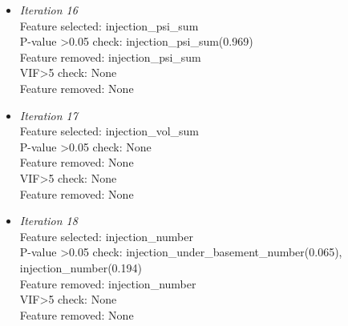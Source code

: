 \documentclass[final-report]{report-template}
\begin{document}
\begin{itemize}
    \item \textit{Iteration 16}\\
    Feature selected: injection\_psi\_sum\\
    P-value \textgreater 0.05 check: injection\_psi\_sum(0.969)\\
    Feature removed: injection\_psi\_sum\\
    VIF\textgreater 5 check: None\\
    Feature removed: None\\
    
    \item \textit{Iteration 17}\\
    Feature selected: injection\_vol\_sum\\
    P-value \textgreater 0.05 check: None\\
    Feature removed: None\\
    VIF\textgreater 5 check: None\\
    Feature removed: None\\
    
    \item \textit{Iteration 18}\\
    Feature selected: injection\_number\\
    P-value \textgreater 0.05 check: injection\_under\_basement\_number(0.065), injection\_number(0.194)\\
    Feature removed: injection\_number\\
    VIF\textgreater 5 check: None\\
    Feature removed: None\\
    \end{itemize}
\end{document}

